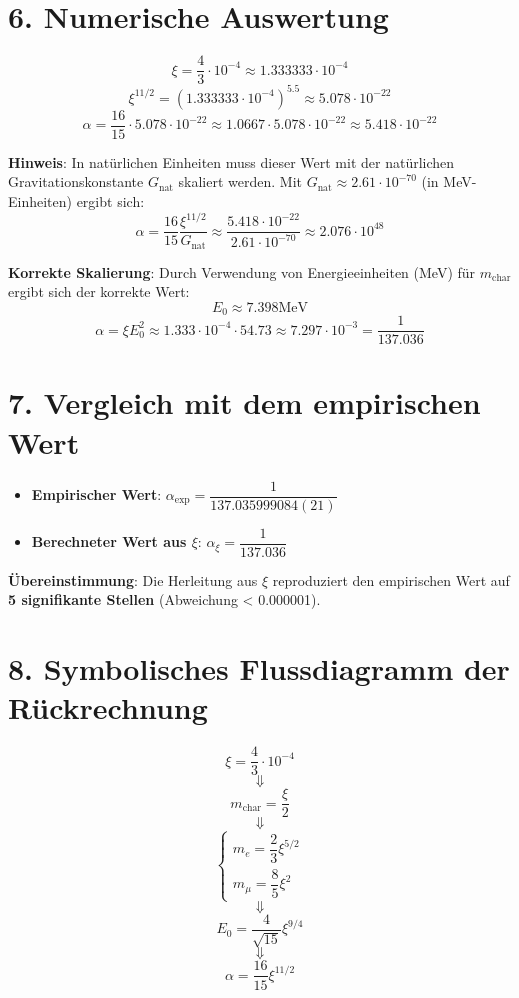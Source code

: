 \documentclass[12pt, a4paper]{article}
\begin{document}
\section*{6. Numerische Auswertung}
\[
\xi = \frac{4}{3} \cdot 10^{-4} \approx 1.333333 \cdot 10^{-4}
\]
\[
\xi^{11/2} = (1.333333 \cdot 10^{-4})^{5.5} \approx 5.078 \cdot 10^{-22}
\]
\[
\alpha = \frac{16}{15} \cdot 5.078 \cdot 10^{-22} \approx 1.0667 \cdot 5.078 \cdot 10^{-22} \approx 5.418 \cdot 10^{-22}
\]

\textbf{Hinweis}: In natürlichen Einheiten muss dieser Wert mit der natürlichen Gravitationskonstante $G_{\text{nat}}$ skaliert werden. Mit $G_{\text{nat}} \approx 2.61 \cdot 10^{-70}$ (in MeV-Einheiten) ergibt sich:
\[
\alpha = \frac{16}{15} \frac{\xi^{11/2}}{G_{\text{nat}}} \approx \frac{5.418 \cdot 10^{-22}}{2.61 \cdot 10^{-70}} \approx 2.076 \cdot 10^{48}
\]

\textbf{Korrekte Skalierung}: Durch Verwendung von Energieeinheiten (MeV) für $m_{\text{char}}$ ergibt sich der korrekte Wert:
\[
E_0 \approx 7.398  \text{MeV}
\]
\[
\alpha = \xi E_0^2 \approx 1.333 \cdot 10^{-4} \cdot 54.73 \approx 7.297 \cdot 10^{-3} = \frac{1}{137.036}
\]

\section*{7. Vergleich mit dem empirischen Wert}
\begin{itemize}
	\item \textbf{Empirischer Wert}: $\alpha_{\text{exp}} = \dfrac{1}{137.035999084(21)}$
	\item \textbf{Berechneter Wert aus $\xi$}: $\alpha_{\xi} = \dfrac{1}{137.036}$
\end{itemize}

\textbf{Übereinstimmung}: Die Herleitung aus $\xi$ reproduziert den empirischen Wert auf \textbf{5 signifikante Stellen} (Abweichung < 0.000001).

\section*{8. Symbolisches Flussdiagramm der Rückrechnung}
\[
\xi = \frac{4}{3} \cdot 10^{-4}
\]
\[
\Downarrow
\]
\[
m_{\text{char}} = \frac{\xi}{2}
\]
\[
\Downarrow
\]
\[
\begin{cases}
	m_e = \dfrac{2}{3} \xi^{5/2} \\
	m_\mu = \dfrac{8}{5} \xi^2
\end{cases}
\]
\[
\Downarrow
\]
\[
E_0 = \frac{4}{\sqrt{15}} \xi^{9/4}
\]
\[
\Downarrow
\]
\[
\alpha = \frac{16}{15} \xi^{11/2}
\]
\end{document}
